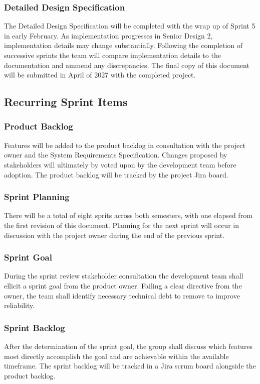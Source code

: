 \subsubsection{Detailed Design Specification}
The Detailed Design Specification will be completed with the wrap up of Sprint 5 in early February. As implementation progresses in Senior Design 2, implementation details may change substantially. Following the completion of successive sprints the team will compare implementation details to the documentation and ammend any discrepancies. The final copy of this document will be submitted in April of 2027 with the completed project.

\subsection{Recurring Sprint Items}

\subsubsection{Product Backlog}
Features will be added to the product backlog in consultation with the project owner and the System Requirements Specification. Changes proposed by stakeholders will ultimately by voted upon by the development team before adoption. The product backlog will be tracked by the project Jira board.

\subsubsection{Sprint Planning}
There will be a total of eight sprits across both semesters, with one elapsed from the first revision of this document. Planning for the next sprint will occur in discussion with the project owner during the end of the previous sprint.

\subsubsection{Sprint Goal}
During the sprint review stakeholder consultation the development team shall ellicit a sprint goal from the product owner. Failing a clear directive from the owner, the team shall identify necessary technical debt to remove to improve reliability.

\subsubsection{Sprint Backlog}
After the determination of the sprint goal, the group shall discuss which features most directly accomplish the goal and are achievable within the available timeframe. The sprint backlog will be tracked in a Jira scrum board alongside the product backlog.

